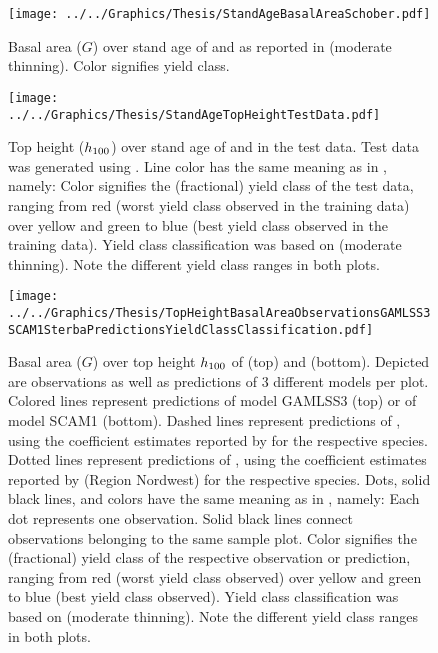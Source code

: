 \begin{figure}[h]
  \centering
  \texttt{[image: ../../Graphics/Thesis/StandAgeBasalAreaSchober.pdf]}
  \caption{Basal area (\(G\)) over stand age of \Beech{} and \Spruce{} as reported in \textcite{Schober1995} (moderate thinning).  Color signifies yield class.}
  \label{fig:StandAgeBasalAreaSchober}
\end{figure}

\begin{figure}[h]
  \centering
  \texttt{[image: ../../Graphics/Thesis/StandAgeTopHeightTestData.pdf]}
  \caption{Top height (\(h_{100}{}\)) over stand age of \Beech{} and \Spruce{} in the test data.  Test data was generated using .  Line color has the same meaning as in , namely:  Color signifies the (fractional) yield class of the test data, ranging from red (worst yield class observed in the training data) over yellow and green to blue (best yield class observed in the training data).  Yield class classification was based on \textcite{Schober1995} (moderate thinning).  Note the different yield class ranges in both plots.}
  \label{fig:StandAgeTopHeightTestData}
\end{figure}

\begin{figure}[h]
  \centering
  \texttt{[image: ../../Graphics/Thesis/TopHeightBasalAreaObservationsGAMLSS3SCAM1SterbaPredictionsYieldClassClassification.pdf]}
  \caption{Basal area (\(G\)) over top height \(h_{100}{}\) of \Beech{} (top) and \Spruce{} (bottom). Depicted are observations as well as predictions of 3 different models per plot.  Colored lines represent predictions of model GAMLSS3 (top) or of model SCAM1 (bottom).  Dashed lines represent predictions of , using the coefficient estimates reported by \textcite{Woerdehoff2016} for the respective species.  Dotted lines represent predictions of , using the coefficient estimates reported by \textcite{Doebbeler2004} (Region Nordwest) for the respective species.  Dots, solid black lines, and colors have the same meaning as in , namely:  Each dot represents one observation.  Solid black lines connect observations belonging to the same sample plot.  Color signifies the (fractional) yield class of the respective observation or prediction, ranging from red (worst yield class observed) over yellow and green to blue (best yield class observed).  Yield class classification was based on \textcite{Schober1995} (moderate thinning).  Note the different yield class ranges in both plots.}
  \label{fig:TopHeightBasalAreaObservationsGAMLSS3SCAM1SterbaPredictionsYieldClassClassification}
\end{figure}


